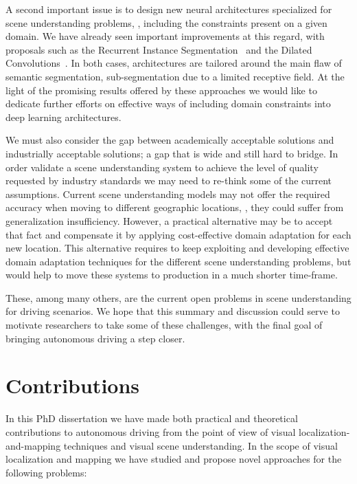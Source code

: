 A second important issue is to design new neural architectures specialized for scene understanding problems, \ie, including the constraints present on a given domain. We have already seen important improvements at this regard, with proposals such as the Recurrent Instance Segmentation~\cite{Romera-ParedesT15} and the Dilated Convolutions~\cite{YuKoltun2016}. In both cases, architectures are tailored around the main flaw of semantic segmentation, sub-segmentation due to a limited receptive field. At the light of the promising results offered by these approaches we would like to dedicate further efforts on effective ways of including domain constraints into deep learning architectures. 

We must also consider the gap between academically acceptable solutions and industrially acceptable solutions; a gap that is wide and still hard to bridge. In order validate a scene understanding system to achieve the level of quality requested by industry standards we may need to re-think some of the current assumptions. Current scene understanding models may not offer the required accuracy when moving to different geographic locations, \ie, they could suffer from generalization insufficiency. However, a practical alternative may be to accept that fact and compensate it by applying cost-effective domain adaptation for each new location. This alternative requires to keep exploiting and developing effective domain adaptation techniques for the different scene understanding problems, but would help to move these systems to production in a much shorter time-frame.

These, among many others, are the current open problems in scene understanding for driving scenarios. We hope that this summary and discussion could serve to motivate researchers to take some of these challenges, with the final goal of bringing autonomous driving a step closer. 

\section{Contributions}

In this PhD dissertation we have made both practical and theoretical contributions to autonomous driving from the point of view of visual localization-and-mapping techniques and visual scene understanding. In the scope of visual localization and mapping we have studied and propose novel approaches for the following problems:

